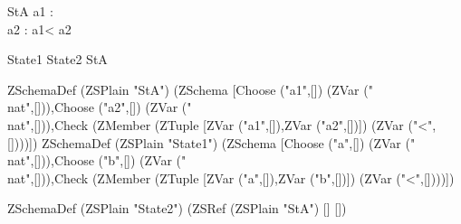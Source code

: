 \begin{schema}{StA}
a1 : \nat\\
a2 : \nat
\where
a1< a2
\end{schema}

\begin{zed}
State1 
\also State2  StA
\end{zed}

ZSchemaDef (ZSPlain "StA") (ZSchema [Choose ("a1",[]) (ZVar ("\\nat",[])),Choose ("a2",[]) (ZVar ("\\nat",[])),Check (ZMember (ZTuple [ZVar ("a1",[]),ZVar ("a2",[])]) (ZVar ("<",[])))])
ZSchemaDef (ZSPlain "State1") (ZSchema [Choose ("a",[]) (ZVar ("\\nat",[])),Choose ("b",[]) (ZVar ("\\nat",[])),Check (ZMember (ZTuple [ZVar ("a",[]),ZVar ("b",[])]) (ZVar ("<",[])))])

ZSchemaDef (ZSPlain "State2") (ZSRef (ZSPlain "StA") [] [])